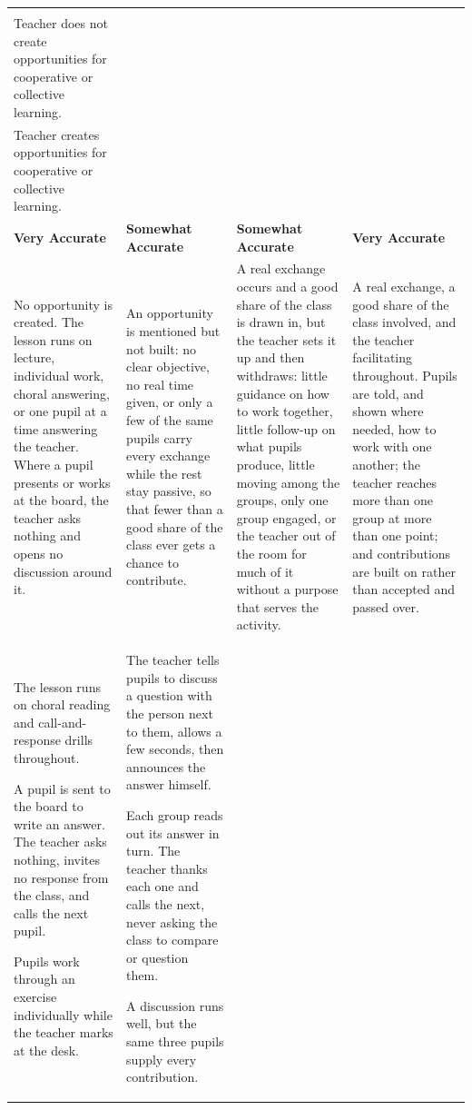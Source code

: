 \documentclass[10pt,a4paper]{article}
\makeatletter
\newcommand{\exlistsize}{\scriptsize}
\renewcommand{\arraystretch}{1.25}
\newlength{\gridw}\newlength{\stemw}\newlength{\stemh}\newlength{\stemtop}
\newcommand{\stemrow}[2]{%
  \setlength{\stemtop}{1.15\ht\strutbox}%
  \setlength{\stemw}{0.5\dimexpr\gridw-2\arrayrulewidth\relax}%
  \sbox{\stemAbox}{\begin{minipage}[t]{\dimexpr\stemw-4.4mm\relax}\RaggedRight
      \footnotesize\textbf{Column A}\\#1\end{minipage}}%
  \sbox{\stemBbox}{\begin{minipage}[t]{\dimexpr\stemw-4.4mm\relax}\RaggedRight
      \footnotesize\textbf{Column B}\\#2\end{minipage}}%
  \setlength{\stemh}{\dimexpr\ht\stemAbox+\dp\stemAbox\relax}%
  \ifdim\dimexpr\ht\stemBbox+\dp\stemBbox\relax>\stemh
    \setlength{\stemh}{\dimexpr\ht\stemBbox+\dp\stemBbox\relax}\fi
  \setlength{\stemh}{\dimexpr\stemtop+\stemh+2.6mm\relax}%
  \begin{tikzpicture}[inner sep=0pt,outer sep=0pt,baseline=0pt]
    \shade[left color=gradA,middle color=gradM,right color=gradB]
      (0,\stemtop) rectangle (\dimexpr\gridw-2\arrayrulewidth\relax,
                              \dimexpr\stemtop-\stemh\relax);
    \draw[black,line width=\arrayrulewidth]
      (\stemw,\stemtop) -- (\stemw,\dimexpr\stemtop-\stemh\relax);
    \node[anchor=north west] at (2.2mm,\dimexpr\stemtop-1.2mm\relax)
      {\usebox{\stemAbox}};
    \node[anchor=north west] at (\dimexpr\stemw+2.2mm\relax,
                                 \dimexpr\stemtop-1.2mm\relax)
      {\usebox{\stemBbox}};
  \end{tikzpicture}}
\newcommand{\scoregrid}[4]{%
  \setlength{\gridw}{\linewidth}%
  \renewcommand{\arraystretch}{1.06}%
  \noindent\footnotesize
  \begin{tabularx}{\linewidth}{|>{\RaggedRight\arraybackslash}X
                               |>{\RaggedRight\arraybackslash}X
                               |>{\RaggedRight\arraybackslash}X
                               |>{\RaggedRight\arraybackslash}X|}
  \hline
  \multicolumn{4}{|@{}l@{}|}{\stemrow{#1}{#2}}\\
  \hline
  \rowcolor{tsub}
  \centering\arraybackslash\textbf{Very Accurate} &
  \centering\arraybackslash\textbf{Somewhat Accurate} &
  \centering\arraybackslash\textbf{Somewhat Accurate} &
  \centering\arraybackslash\textbf{Very Accurate}\\
  \hline
  #3\\
  \hline
  \rowcolor{texfill} #4\\
  \hline
  \end{tabularx}\normalsize}
\makeatother
\begin{document}
\scoregrid{Teacher does not create opportunities for cooperative or collective learning.}%
          {Teacher creates opportunities for cooperative or collective learning.}{%
\footnotesize No opportunity is created. The lesson runs on lecture, individual work, choral answering, or
one pupil at a time answering the teacher. Where a pupil presents or works at the board, the teacher asks
nothing and opens no discussion around it. &
\footnotesize An opportunity is mentioned but not built: no clear objective, no real time given, or only a
few of the same pupils carry every exchange while the rest stay passive, so that fewer than a good share of the
class ever gets a chance to contribute. &
\footnotesize A real exchange occurs and a good share of the class is drawn in, but the teacher sets it up
and then withdraws: little guidance on how to work together, little follow-up on what pupils produce, little moving
among the groups, only one group engaged, or the teacher out of the room for much of it without a purpose
that serves the activity.  &
\footnotesize A real exchange, a good share of the class involved, and the teacher facilitating throughout.
Pupils are told, and shown where needed, how to work with one another; the teacher reaches more than one
group at more than one point; and contributions are built on rather than accepted and passed over.
}{%
\exlistsize\begin{exlist}
  \item The lesson runs on choral reading and call-and-response drills throughout.
  \item A pupil is sent to the board to write an answer. The teacher asks nothing, invites no response from
        the class, and calls the next pupil.
  \item Pupils work through an exercise individually while the teacher marks at the desk.
\end{exlist} &
\exlistsize\begin{exlist}
  \item The teacher tells pupils to discuss a question with the person next to them, allows a few seconds,
        then announces the answer himself.
  \item Each group reads out its answer in turn. The teacher thanks each one and calls the next, never
        asking the class to compare or question them.
  \item A discussion runs well, but the same three pupils supply every contribution.
\end{exlist} &
}
\end{document}
